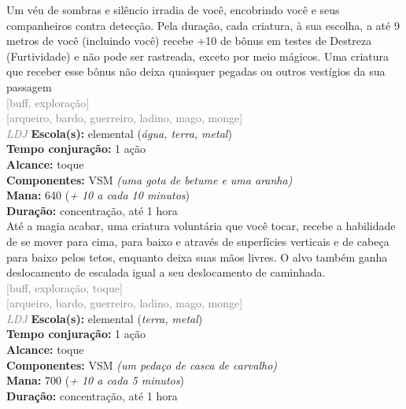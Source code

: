 \documentclass{RPG_Adventure}[2021/10/20]
\begin{document}
{\normalsize Um véu de sombras e silêncio irradia de você, encobrindo você e seus companheiros contra detecção. Pela duração, cada criatura, à sua escolha, a até 9 metros de você (incluindo você) recebe +10 de bônus em testes de Destreza (Furtividade) e não pode ser rastreada, exceto por meio mágicos. Uma criatura que receber esse bônus não deixa quaisquer pegadas ou outros vestígios da sua passagem\\}
{\scriptsize \textcolor{gray}{[buff, exploração]\\}}
{\scriptsize \textcolor{gray}{[arqueiro, bardo, guerreiro, ladino, mago, monge]\\}}
{\tiny \textcolor{gray}{\textit{LDJ}}}\jump{}
{\small \t \textbf{Escola(s):} elemental (\textit{água, terra, metal})\\\t \textbf{Tempo conjuração:} 1 ação\\\t \textbf{Alcance:} toque\\\t \textbf{Componentes:} VSM \textit{(uma gota de betume e uma aranha)}\\\t \textbf{Mana:} 640 (\textit{+ 10 a cada 10 minutos})\\\t \textbf{Duração:} concentração, até 1 hora\\}
{\normalsize Até a magia acabar, uma criatura voluntária que você tocar, recebe a habilidade de se mover para cima, para baixo e através de superfícies verticais e de cabeça para baixo pelos tetos, enquanto deixa suas mãos livres. O alvo também ganha deslocamento de escalada igual a seu deslocamento de caminhada.\\}
{\scriptsize \textcolor{gray}{[buff, exploração, toque]\\}}
{\scriptsize \textcolor{gray}{[arqueiro, bardo, guerreiro, ladino, mago, monge]\\}}
{\tiny \textcolor{gray}{\textit{LDJ}}}\jump{}
{\small \t \textbf{Escola(s):} elemental (\textit{terra, metal})\\\t \textbf{Tempo conjuração:} 1 ação\\\t \textbf{Alcance:} toque\\\t \textbf{Componentes:} VSM \textit{(um pedaço de casca de carvalho)}\\\t \textbf{Mana:} 700 (\textit{+ 10 a cada 5 minutos})\\\t \textbf{Duração:} concentração, até 1 hora\\}
\end{document}
